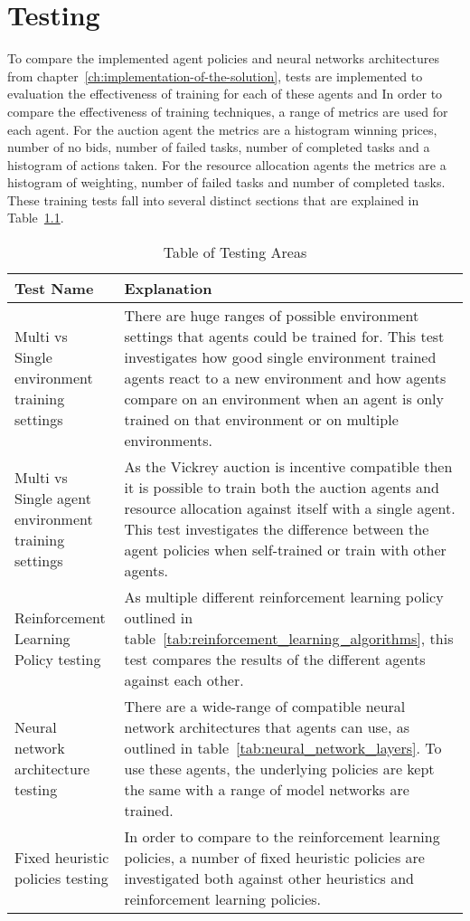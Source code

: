 \chapter{Testing}\label{ch:testing-of-the-implementation}
To compare the implemented agent policies and neural networks architectures from
chapter~\ref{ch:implementation-of-the-solution}, tests are implemented to evaluation the effectiveness of training for
each of these agents and %
In order to compare the effectiveness of training techniques, a range of metrics are used for each agent. For the
auction agent the metrics are a histogram winning prices, number of no bids, number of failed tasks, number of completed
tasks and a histogram of actions taken. For the resource allocation agents the metrics are a histogram of weighting,
number of failed tasks and number of completed tasks. These training tests fall into several distinct sections that are
explained in Table~\ref{tab:testing_areas}.

\begin{table}[h]
    \centering
    \begin{tabular}{|p{4cm}|p{11cm}|} \hline
        Test Name & Explanation \\ \hline
        Multi vs Single environment training settings & There are huge ranges of possible environment settings that
            agents could be trained for. This test investigates how good single environment trained agents react to
            a new environment and how agents compare on an environment when an agent is only trained on that
            environment or on multiple environments. \\ \hline
        Multi vs Single agent environment training settings & As the Vickrey auction is incentive compatible then it is
            possible to train both the auction agents and resource allocation against itself with a single agent. This
            test investigates the difference between the agent policies when self-trained or train with other
            agents. \\ \hline
        Reinforcement Learning Policy testing & As multiple different reinforcement learning policy outlined in
            table~\ref{tab:reinforcement_learning_algorithms}, this test compares the results of the different agents
            against each other. \\ \hline
        Neural network architecture testing & There are a wide-range of compatible neural network architectures that
            agents can use, as outlined in table~\ref{tab:neural_network_layers}. To use these agents, the underlying
            policies are kept the same with a range of model networks are trained. \\ \hline
        Fixed heuristic policies testing & In order to compare to the reinforcement learning policies, a number of
            fixed heuristic policies are investigated both against other heuristics and reinforcement learning
            policies. \\ \hline
    \end{tabular}
    \caption{Table of Testing Areas}
    \label{tab:testing_areas}
\end{table}

